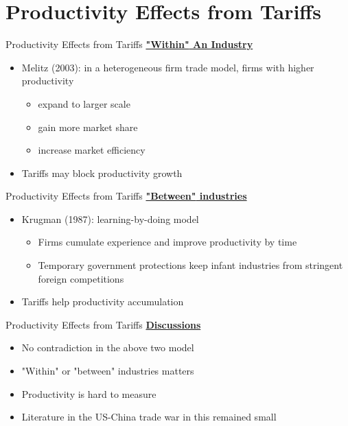 \documentclass{beamer}
\begin{document}
\section{Productivity Effects from Tariffs}
\begin{frame}{Productivity Effects from Tariffs}
\underline{\textbf{{\color{red}"Within"} An Industry}}
\begin{itemize}
    \item Melitz (2003): in a heterogeneous firm trade model, firms with {\color{red}higher productivity}
    \begin{itemize}
        \item expand to larger scale
        \item gain more market share
        \item increase market efficiency
    \end{itemize}
    \item Tariffs may {\color{red}block} productivity growth
\end{itemize}
\end{frame}

\begin{frame}{Productivity Effects from Tariffs}
\underline{\textbf{{\color{red}"Between"} industries}}
\begin{itemize}
    \item Krugman (1987): {\color{red}learning-by-doing} model
    \begin{itemize}
        \item Firms {\color{red}cumulate} experience and {\color{red}improve productivity} by time
        \item Temporary government protections keep infant industries from stringent foreign competitions
    \end{itemize}
    \item Tariffs {\color{red}help} productivity accumulation
\end{itemize}
\end{frame}

\begin{frame}{Productivity Effects from Tariffs}
    \underline{\textbf{{Discussions}}}
    \begin{itemize}
        \item No contradiction in the above two model
        \item {\color{red}"Within"} or {\color{red}"between"} industries matters
        \item Productivity is hard to measure
        \item Literature in the US-China trade war in this remained small
    \end{itemize}
\end{frame}
\end{document}
